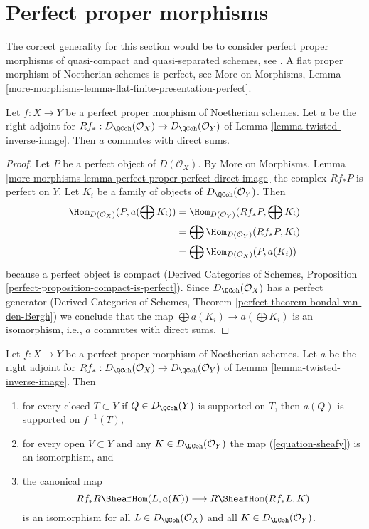 \section{Perfect proper morphisms}
\label{section-flat-and-proper}

\noindent
The correct generality for this section would be to consider
perfect proper morphisms of quasi-compact and quasi-separated
schemes, see \cite{LN}. A flat proper morphism of Noetherian
schemes is perfect, see
More on Morphisms, Lemma
\ref{more-morphisms-lemma-flat-finite-presentation-perfect}.

\begin{lemma}
\label{lemma-proper-flat-noetherian}
Let $f : X \to Y$ be a perfect proper morphism of Noetherian schemes.
Let $a$ be the right adjoint for
$Rf_* : D_\QCoh(\mathcal{O}_X) \to D_\QCoh(\mathcal{O}_Y)$ of
Lemma \ref{lemma-twisted-inverse-image}. Then $a$ commutes with direct sums.
\end{lemma}

\begin{proof}
Let $P$ be a perfect object of $D(\mathcal{O}_X)$. By
More on Morphisms, Lemma
\ref{more-morphisms-lemma-perfect-proper-perfect-direct-image}
the complex $Rf_*P$ is perfect on $Y$.
Let $K_i$ be a family of objects of $D_\QCoh(\mathcal{O}_Y)$.
Then
\begin{align*}
\Hom_{D(\mathcal{O}_X)}(P, a(\bigoplus K_i))
& =
\Hom_{D(\mathcal{O}_Y)}(Rf_*P, \bigoplus K_i) \\
& =
\bigoplus \Hom_{D(\mathcal{O}_Y)}(Rf_*P, K_i) \\
& =
\bigoplus \Hom_{D(\mathcal{O}_X)}(P, a(K_i))
\end{align*}
because a perfect object is compact (Derived Categories of Schemes,
Proposition \ref{perfect-proposition-compact-is-perfect}).
Since $D_\QCoh(\mathcal{O}_X)$ has a perfect generator
(Derived Categories of Schemes, Theorem
\ref{perfect-theorem-bondal-van-den-Bergh})
we conclude that the map $\bigoplus a(K_i) \to a(\bigoplus K_i)$
is an isomorphism, i.e., $a$ commutes with direct sums.
\end{proof}

\begin{lemma}
\label{lemma-proper-flat-noetherian-relative}
Let $f : X \to Y$ be a perfect proper morphism of Noetherian schemes.
Let $a$ be the right adjoint for
$Rf_* : D_\QCoh(\mathcal{O}_X) \to D_\QCoh(\mathcal{O}_Y)$ of
Lemma \ref{lemma-twisted-inverse-image}. Then
\begin{enumerate}
\item for every closed $T \subset Y$ if $Q \in D_\QCoh(Y)$ is supported on $T$,
then $a(Q)$ is supported on $f^{-1}(T)$,
\item for every open $V \subset Y$ and any $K \in D_\QCoh(\mathcal{O}_Y)$
the map (\ref{equation-sheafy}) is an isomorphism, and
\item the canonical map
$$
Rf_*R\SheafHom(L, a(K)) \longrightarrow R\SheafHom(Rf_*L, K)
$$
is an isomorphism for all $L \in D_\QCoh(\mathcal{O}_X)$ and all
$K \in D_\QCoh(\mathcal{O}_Y)$.
\end{enumerate}
\end{lemma}

